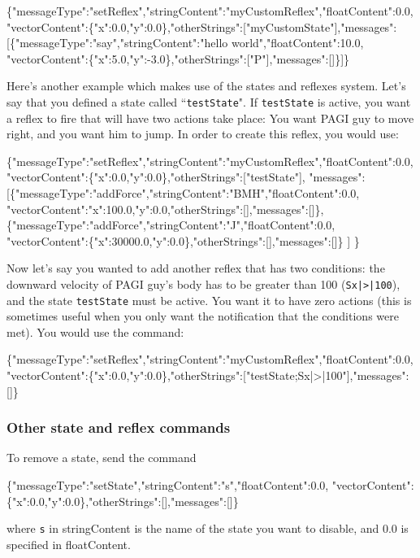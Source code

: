 \begin{itemize}
\begin{center}
	\scriptsize{\{"messageType":"setReflex","stringContent":"myCustomReflex","floatContent":0.0, "vectorContent":\{"x":0.0,"y":0.0\},"otherStrings":["myCustomState"],"messages":[\{"messageType":"say","stringContent":"hello world","floatContent":10.0, "vectorContent":\{"x":5.0,"y":-3.0\},"otherStrings":["P"],"messages":[]\}]\}}
\end{center}
\end{itemize}

Here's another example which makes use of the states and reflexes system. Let's say that you defined a state called ``\texttt{testState}". If \texttt{testState} is active, you want a reflex to fire that will have two actions take place: You want PAGI guy to move right, and you want him to jump. In order to create this reflex, you would use:

\begin{center}
	\scriptsize{\{"messageType":"setReflex","stringContent":"myCustomReflex","floatContent":0.0, "vectorContent":\{"x":0.0,"y":0.0\},"otherStrings":["testState"],
		"messages":[\{"messageType":"addForce","stringContent":"BMH","floatContent":0.0, "vectorContent":{"x":100.0,"y":0.0},"otherStrings":[],"messages":[]\},
		\{"messageType":"addForce","stringContent":"J","floatContent":0.0, "vectorContent":\{"x":30000.0,"y":0.0\},"otherStrings":[],"messages":[]\} ] \}}
\end{center}

Now let's say you wanted to add another reflex that has two conditions: the downward velocity of PAGI guy's body has to be greater than 100 (\texttt{Sx|>|100}), and the state \texttt{testState} must be active. You want it to have zero actions (this is sometimes useful when you only want the notification that the conditions were met). You would use the command:

\begin{center}
	\scriptsize{\{"messageType":"setReflex","stringContent":"myCustomReflex","floatContent":0.0, "vectorContent":\{"x":0.0,"y":0.0\},"otherStrings":["testState;Sx|>|100"],"messages":[]\}}
\end{center}

\subsubsection{Other state and reflex commands}

To remove a state, send the command 
\begin{center}
	\scriptsize{\{"messageType":"setState","stringContent":"s","floatContent":0.0, "vectorContent":\{"x":0.0,"y":0.0\},"otherStrings":[],"messages":[]\} }
\end{center}
where \texttt{s} in stringContent is the name of the state you want to disable, and 0.0 is specified in floatContent.

